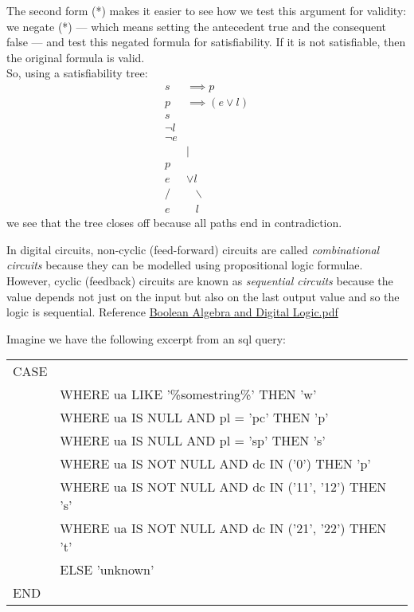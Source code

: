 \documentclass[../MathsNotesBase.tex]{subfiles}
\begin{document}
{\begin{exe}
				The second form (*) makes it easier to see how we test this argument for validity: we negate (*) --- which means setting the antecedent true and the consequent false --- and test this negated formula for satisfiability. If it is not satisfiable, then the original formula is valid.\\
				
				So, using a satisfiability tree:
				\[\begin{aligned}
					s &\implies p  \\
					p &\implies (e \lor l) \\
					s \\
					\lnot l \\
					\lnot e \\
					  & | \\
					p \\
					e &\lor l \\
					/ &\hspace{10pt} \backslash \\
					e &\hspace{10pt} l
				\end{aligned}\]
				we see that the tree closes off because all paths end in contradiction.
			
			
			\nl[12]
			\ex In digital circuits, non-cyclic (feed-forward) circuits are called \textit{combinational circuits} because they can be modelled using propositional logic formulae. However, cyclic (feedback) circuits are known as \textit{sequential circuits} because the value depends not just on the input but also on the last output value and so the logic is sequential. Reference \href{https://www2.southeastern.edu/Academics/Faculty/kyang/2018/Spring/CMPS375/ClassNotes/CMPS375ClassNotesChap03.pdf}{Boolean Algebra and Digital Logic.pdf}

			
			\nl[12]
			\ex Imagine we have the following excerpt from an sql query:\\
			\nl
			\begin{tabular}[h!]{*2l}
				CASE &  \\
				     &WHERE ua LIKE '\%somestring\%' THEN 'w' \\
				     &WHERE ua IS NULL AND pl = 'pc' THEN 'p' \\
				     &WHERE ua IS NULL AND pl = 'sp' THEN 's' \\
				     &WHERE ua IS NOT NULL AND dc IN ('0') THEN 'p' \\
				     &WHERE ua IS NOT NULL AND dc IN ('11', '12') THEN 's' \\
				     &WHERE ua IS NOT NULL AND dc IN ('21', '22') THEN 't' \\
				     &ELSE 'unknown' \\
				END
			\end{tabular}\\
		

\end{exe}}
\end{document}
